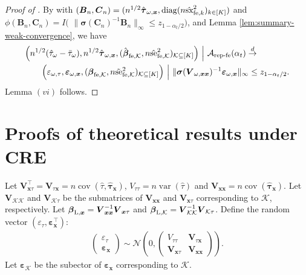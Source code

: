 \documentclass[12pt]{article}
\newcommand{\se}{\textnormal{se}}
\newcommand{\Lin}{\textnormal{L}}
\newcommand{\cov}{\operatorname{cov}}
\newcommand{\diag}{\operatorname{diag}}
\newcommand{\var}{\operatorname{var}}
\newcommand{\wconv}{\stackrel{d}{\rightarrow}}
\newcommand{\mk}{\mathcal{K}}
\newcommand{\ma}{\mathcal{A}}
\newcommand{\repfe}{\textnormal{rep-fe}}
\newcommand{\fe}{\textnormal{fe}}
\newcommand{\bs}{\boldsymbol}
\newcommand{\sx}{\textnormal{sx}}
\begin{document}
\begin{proof}[Proof of ]
By  with $(\bs{B}_n,\bs{C}_n) = (n^{1/2}\hat{\bs{\tau}}_{\omega,\bs{x}},\diag(n\hat{\sx}^2_{\fe ,k})_{k\in [K]} )$ and $\phi(\bs{B}_n,\bs{C}_n) = I($ $\|\bs{\sigma}(\bs{C}_n)^{-1}\bs{B}_n\|_{\infty}\leq z_{1-\alpha_t/2})$, and Lemma \ref{lem:summary-weak-convergence}, we have
\begin{align*}
   & \Big(n^{1/2}(\hat{\tau}_{\omega}-\bar{\tau}_{\omega}), n^{1/2}\hat{\bs{\tau}}_{\omega,\bs{x}},(\hat{\bs{\beta}}_{\fe ,\mk}, n \hat{\se}_{\fe ,\mk}^2)_{\mk\subseteq [K]} \Big) ~\Big|~ \ma_{\repfe}(\alpha_t) \wconv \\
      & \qquad
      \Big(\varepsilon_{\omega,\tau}, \bs{\varepsilon}_{\omega,\bs{x}}, (\bs{\beta}_{\fe ,\mk}, n \tilde{\se}_{\fe ,\mk}^2)_{\mk\subseteq [K]}\Big) ~\Big|~ \|\bs{\sigma}(\bs{V}_{\omega,\bs{x}\bs{x}})^{-1}\bs{\varepsilon}_{\omega,\bs{x}}\|_{\infty} \leq z_{1-\alpha_t/2}.
\end{align*}
Lemma $(vi)$ follows.

\end{proof}


\section{Proofs of theoretical results under CRE}
\label{sec:results-under-cre}

Let $\bs{V}_{\bs{x}\tau}^\top = \bs{V}_{\tau\bs{x}} = n\cov(\hat{\tau},\hat{\bs{\tau}}_{\bs{x}})$, $V_{\tau\tau} = n\var(\hat{\tau})$ and $\bs{V}_{\bs{x}\bs{x}} = n\cov(\hat{\bs{\tau}}_{\bs{x}})$. Let $\bs{V}_{\mk\mk}$ and $\bs{V}_{\mk\tau}$ be the submatrices of $\bs{V}_{\bs{x}\bs{x}}$ and $\bs{V}_{\bs{x}\tau}$ corresponding to $\mk$, respectively. Let $\bs{\beta}_{\Lin, \bs{x}} = \bs{V}_{\bs{x}\bs{x}}^{-1}\bs{V}_{\bs{x}\tau}$ and $\bs{\beta}_{\Lin,\mk} = \bs{V}_{\mk\mk}^{-1}\bs{V}_{\mk\tau}$. Define the random vector $(\varepsilon_{\tau},\bs{\varepsilon}_{\bs{x}}^\top)$:
\begin{align*}
    \begin{pmatrix}
      \varepsilon_{\tau} \\
      \bs{\varepsilon}_{\bs{x}}
    \end{pmatrix} \sim \mathcal{N}\left(0,\begin{pmatrix}
      V_{\tau\tau} & \bs{V}_{\tau\bs{x}}\\
      \bs{V}_{\bs{x}\tau} & \bs{V}_{\bs{x}\bs{x}}
      \end{pmatrix}\right).
  \end{align*}
  Let $\bs{\varepsilon}_{\mk}$ be the subector of $\bs{\varepsilon}_{\bs{x}}$ corresponding to $\mk$. 
\end{document}

